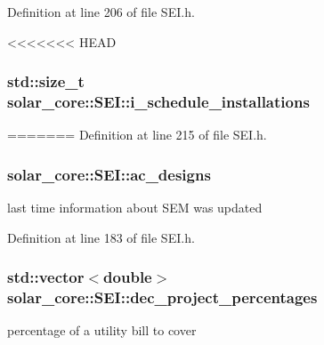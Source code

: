 \begin{figure}[H]
\begin{center}
Definition at line 206 of file S\+E\+I.\+h.

<<<<<<< HEAD
\hypertarget{classsolar__core_1_1_s_e_i_ad906dcd5b638e405a7daf14539096377}{}
\subsubsection[{i\+\_\+schedule\+\_\+installations}]{\setlength{\rightskip}{0pt plus 5cm}std\+::size\+\_\+t solar\+\_\+core\+::\+S\+E\+I\+::i\+\_\+schedule\+\_\+installations\hspace{0.3cm}{\ttfamily [protected]}}\label{classsolar__core_1_1_s_e_i_ad906dcd5b638e405a7daf14539096377}
=======
Definition at line 215 of file S\+E\+I.\+h.

\hypertarget{classsolar__core_1_1_s_e_i_a147ec60ca551d9195cdf5937eda5f903}{}
\subsubsection[{ac\+\_\+designs}]{ solar\+\_\+core\+::\+S\+E\+I\+::ac\+\_\+designs\hspace{0.3cm}{\ttfamily [protected]}}\label{classsolar__core_1_1_s_e_i_a147ec60ca551d9195cdf5937eda5f903}
last time information about S\+E\+M was updated 

Definition at line 183 of file S\+E\+I.\+h.

\hypertarget{classsolar__core_1_1_s_e_i_a272838ea17b8cd4e49c9a8c53facfd8f}{}
\subsubsection[{dec\+\_\+project\+\_\+percentages}]{\setlength{\rightskip}{0pt plus 5cm}std\+::vector$<$double$>$ solar\+\_\+core\+::\+S\+E\+I\+::dec\+\_\+project\+\_\+percentages\hspace{0.3cm}{\ttfamily [protected]}}\label{classsolar__core_1_1_s_e_i_a272838ea17b8cd4e49c9a8c53facfd8f}
percentage of a utility bill to cover 


\end{center}
\end{figure}
